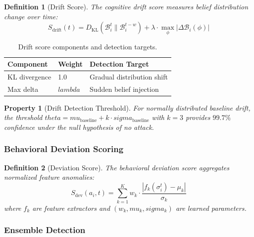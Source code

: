\documentclass[
]{article}
\newtheorem{definition}{Definition}[section]
\newtheorem{property}{Property}[section]
\begin{document}
\begin{definition}[Drift Score]
\label{def:drift-score}
The cognitive drift score measures belief distribution change over time:
\begin{equation}
\label{eq:drift-score}
S_{\text{drift}}(t) = D_{\text{KL}}(\mathcal{B}_i^t \| \mathcal{B}_i^{t-w}) + \lambda \cdot \max_\phi |\Delta \mathcal{B}_i(\phi)|
\end{equation}
\end{definition}

\begin{table}[htbp]
\centering
\caption{Drift score components and detection targets.}
\label{tab:drift-components}
\begin{tabular}{@{}llp{5cm}@{}}
\toprule
Component & Weight & Detection Target \\
\midrule
KL divergence & 1.0 & Gradual distribution shift \\
Max delta & $lambda$ & Sudden belief injection \\
\bottomrule
\end{tabular}
\end{table}

\begin{property}[Drift Detection Threshold]
\label{prop:drift-threshold}
For normally distributed baseline drift, the threshold $theta = mu_{\text{baseline}} + k \cdot sigma_{\text{baseline}}$ with $k = 3$ provides $99.7\%$ confidence under the null hypothesis of no attack.
\end{property}

\subsubsection{Behavioral Deviation
Scoring}\label{behavioral-deviation-scoring}

\begin{definition}[Deviation Score]
\label{def:deviation-score}
The behavioral deviation score aggregates normalized feature anomalies:
\begin{equation}
\label{eq:deviation-score}
S_{\text{dev}}(a_i, t) = \sum_{k=1}^K w_k \cdot \frac{|f_k(\sigma_i^t) - \mu_k|}{\sigma_k}
\end{equation}
where $f_k$ are feature extractors and $(w_k, mu_k, sigma_k)$ are learned parameters.
\end{definition}

\subsubsection{Ensemble Detection}\label{ensemble-detection}
\end{document}
